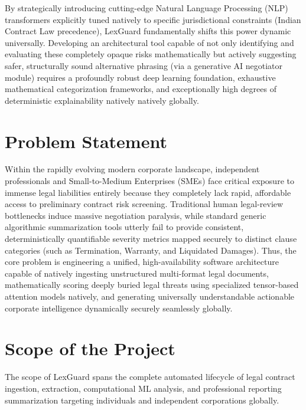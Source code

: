 \documentclass[a4paper,12pt]{report}
\begin{document}
By strategically introducing cutting-edge Natural Language Processing (NLP) transformers explicitly tuned natively to specific jurisdictional constraints (Indian Contract Law precedence), LexGuard fundamentally shifts this power dynamic universally. Developing an architectural tool capable of not only identifying and evaluating these completely opaque risks mathematically but actively suggesting safer, structurally sound alternative phrasing (via a generative AI negotiator module) requires a profoundly robust deep learning foundation, exhaustive mathematical categorization frameworks, and exceptionally high degrees of deterministic explainability natively natively globally.

\section{Problem Statement}

Within the rapidly evolving modern corporate landscape, independent professionals and Small-to-Medium Enterprises (SMEs) face critical exposure to immense legal liabilities entirely because they completely lack rapid, affordable access to preliminary contract risk screening. Traditional human legal-review bottlenecks induce massive negotiation paralysis, while standard generic algorithmic summarization tools utterly fail to provide consistent, deterministically quantifiable severity metrics mapped securely to distinct clause categories (such as Termination, Warranty, and Liquidated Damages). Thus, the core problem is engineering a unified, high-availability software architecture capable of natively ingesting unstructured multi-format legal documents, mathematically scoring deeply buried legal threats using specialized tensor-based attention models natively, and generating universally understandable actionable corporate intelligence dynamically securely seamlessly globally.

\section{Scope of the Project}

The scope of LexGuard spans the complete automated lifecycle of legal contract ingestion, extraction, computational ML analysis, and professional reporting summarization targeting individuals and independent corporations globally. 
\end{document}
